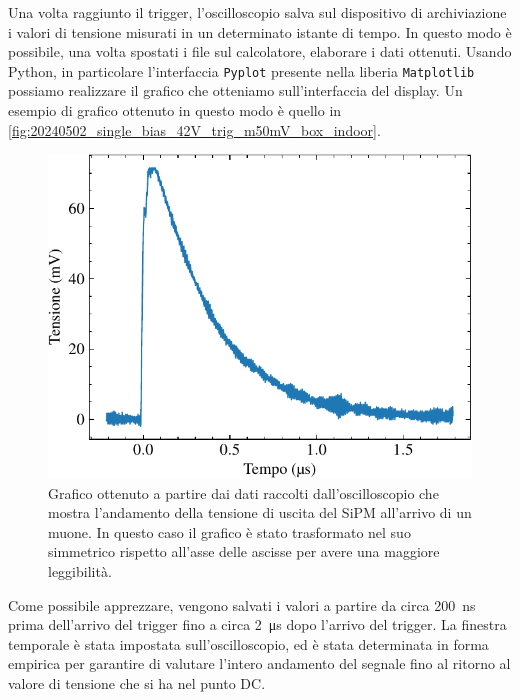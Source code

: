 Una volta raggiunto il trigger, l'oscilloscopio salva sul dispositivo di archiviazione i valori di tensione misurati in un determinato
istante di tempo. In questo modo è possibile, una volta spostati i file sul calcolatore, elaborare i dati ottenuti. Usando Python, in
particolare l'interfaccia \texttt{Pyplot} presente nella liberia \texttt{Matplotlib} possiamo realizzare il grafico che otteniamo
sull'interfaccia del display. Un esempio di grafico ottenuto in questo modo è quello in \autoref*{fig:20240502_single_bias_42V_trig_m50mV_box_indoor}.
\begin{figure}[h!]
    \centering
    \includegraphics[width=.75\linewidth]{img/20240502_single_bias_42V_trig_m50mV_box_indoor.pdf}
    \caption{Grafico ottenuto a partire dai dati raccolti dall'oscilloscopio che mostra l'andamento della tensione di uscita del SiPM all'arrivo di un muone.
        In questo caso il grafico è stato trasformato nel suo simmetrico rispetto all'asse delle ascisse per avere una maggiore leggibilità.}
    \label{fig:20240502_single_bias_42V_trig_m50mV_box_indoor}
\end{figure}
Come possibile apprezzare, vengono salvati i valori a partire da circa \SI{200}{\nano\second} prima dell'arrivo del trigger fino a circa
\SI{2}{\micro\second} dopo l'arrivo del trigger. La finestra temporale è stata impostata sull'oscilloscopio, ed è stata determinata in forma
empirica per garantire di valutare l'intero andamento del segnale fino al ritorno al valore di tensione che si ha nel punto DC.

